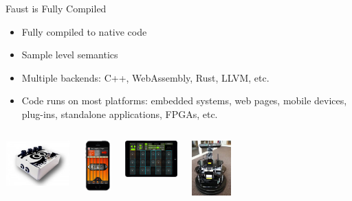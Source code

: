 
\begin{frame}[fragile]{Faust is Fully Compiled}
	\begin{itemize}

		\item Fully compiled to native code
        \item Sample level semantics
        \item Multiple backends: C++, WebAssembly, Rust, LLVM, etc.
        \item Code runs on most platforms: embedded systems, web pages, mobile devices, plug-ins, standalone applications, FPGAs, etc.

	\end{itemize}
    \begin{columns}
        \begin{center}
          \href{file:/Users/yannorlarey/Documents/demo-faust/0-Videos/1-faust-owl-android.mp4}{\includegraphics[width=2.5cm,keepaspectratio=true]{images/owl.jpg}}
        \end{center}

        \begin{center}
          \href{file:/Users/yannorlarey/Documents/demo-faust/0-Videos/5.1-MoForte-PowerChord.mp4}{\includegraphics[width=1cm,keepaspectratio=true]{images/moforte.png}}
        \end{center}

        \begin{center}
          \href{file:/Users/yannorlarey/Documents/demo-faust/0-Videos/5.2-Geo-Shred.mp4}{\includegraphics[width=2cm,keepaspectratio=true]{images/GeoShred}}
        \end{center}

        \begin{center}
            \href{file:/Users/yannorlarey/Documents/demo-faust/0-Videos/2-faust-ros.mp4}{\includegraphics[width=1.5cm,keepaspectratio=true]{images/emoxone}}
          \end{center}


\end{columns}
\end{frame}
